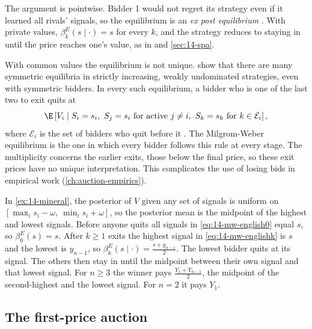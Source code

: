 The argument is pointwise. Bidder 1 would not regret its strategy even if it learned all rivals' signals,
so the equilibrium is an \emph{ex post equilibrium} \citep[Chapter~6]{Krishna2010}. With private values,
$\beta^E_k(s\mid\cdot)=s$ for every $k$, and the strategy reduces to staying in until the price reaches one's
value, as in \citet[eq.~(2.6)]{AtheyHaile2007} and \cref{sec:14-spa}.

With common values the equilibrium is not unique. \citet{BikhchandaniHaileRiley2002} show that there are
many symmetric equilibria in strictly increasing, weakly undominated strategies, even with symmetric bidders.
In every such equilibrium, a bidder who is one of the last two to exit quits at
\begin{equation*}
  \E\left[V_i\mid S_i=s_i,\ S_j=s_i\text{ for active }j\ne i,\ S_k=s_k\text{ for }k\in\mathcal E_i\right],
\end{equation*}
where $\mathcal E_i$ is the set of bidders who quit before it \citep[eq.~(2.7)]{AtheyHaile2007}. The
Milgrom-Weber equilibrium is the one in which every bidder follows this rule at every stage. The multiplicity
concerns the earlier exits, those below the final price, so these exit prices have no unique interpretation. This complicates the use
of losing bids in empirical work (\cref{ch:auction-empirics}).

\begin{example}\label{ex:14-mineral-english}
In \cref{ex:14-mineral}, the posterior of $V$ given any set of signals is uniform on
$[\max_is_i-\omega,\ \min_is_i+\omega]$, so the posterior mean is the midpoint of the highest and lowest
signals. Before anyone quits all signals in \eqref{eq:14-mw-english0} equal $s$, so $\beta^E_0(s)=s$. After
$k\ge1$ exits the highest signal in \eqref{eq:14-mw-englishk} is $s$ and the lowest is $y_{n-1}$, so
$\beta^E_k(s\mid\cdot)=\frac{s+y_{n-1}}{2}$. The lowest bidder quits at its signal. The others then stay in
until the midpoint between their own signal and that lowest signal. For $n\ge3$ the winner pays
$\frac{Y_1+Y_{n-1}}{2}$, the midpoint of the second-highest and the lowest signal. For $n=2$ it pays $Y_1$.
\end{example}

\subsection{The first-price auction}\label{sec:14-mw-fpa}

